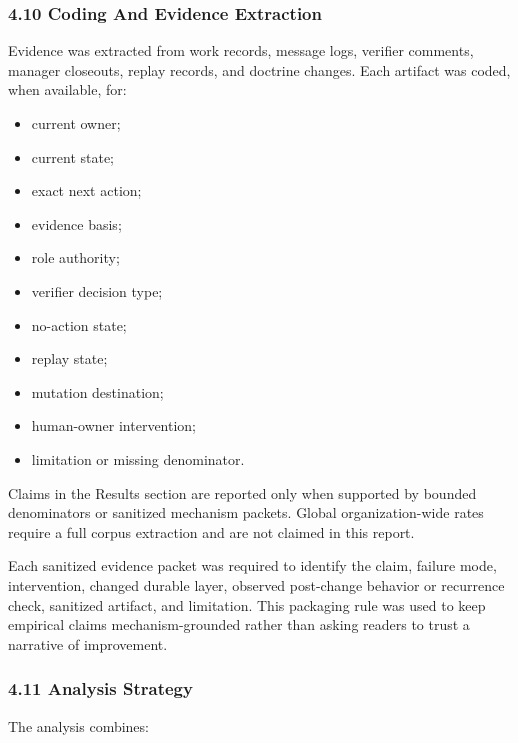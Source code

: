 \documentclass[
]{article}
\providecommand{\tightlist}{%
  \setlength{\itemsep}{0pt}\setlength{\parskip}{0pt}}
\begin{document}
\subsubsection{4.10 Coding And Evidence Extraction}\label{coding-and-evidence-extraction}

Evidence was extracted from work records, message logs, verifier comments, manager closeouts, replay records, and doctrine changes. Each artifact was coded, when available, for:

\begin{itemize}
\tightlist
\item
  current owner;
\item
  current state;
\item
  exact next action;
\item
  evidence basis;
\item
  role authority;
\item
  verifier decision type;
\item
  no-action state;
\item
  replay state;
\item
  mutation destination;
\item
  human-owner intervention;
\item
  limitation or missing denominator.
\end{itemize}

Claims in the Results section are reported only when supported by bounded denominators or sanitized mechanism packets. Global organization-wide rates require a full corpus extraction and are not claimed in this report.

Each sanitized evidence packet was required to identify the claim, failure mode, intervention, changed durable layer, observed post-change behavior or recurrence check, sanitized artifact, and limitation. This packaging rule was used to keep empirical claims mechanism-grounded rather than asking readers to trust a narrative of improvement.

\subsubsection{4.11 Analysis Strategy}\label{analysis-strategy}

The analysis combines:
\end{document}
